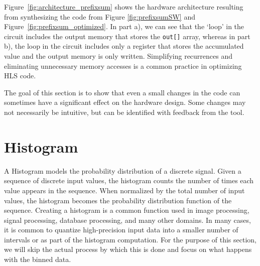 Figure~\ref{fig:architecture_prefixsum} shows the hardware architecture resulting from synthesizing the code from Figure \ref{fig:prefixsumSW} and Figure~\ref{fig:prefixsum_optimized}.   In part a), we can see that the `loop' in the circuit includes the output memory that stores the \lstinline{out[]} array, whereas in part b), the loop in the circuit includes only a register that stores the accumulated value and the output memory is only written.  Simplifying recurrences and eliminating unnecessary memory accesses is a common practice in optimizing HLS code.



The goal of this section is to show that even a small changes in the code can sometimes have a significant effect on the hardware design. Some changes may not necessarily be intuitive, but can be identified with feedback from the tool.

\section{Histogram}
\label{sec:histogram}

A Histogram models the probability distribution of a discrete signal. Given a sequence of discrete input values, the histogram counts the number of times each value appears in the sequence.  When normalized by the total number of input values, the histogram becomes the probability distribution function of the sequence.  Creating a histogram is a common function used in image processing, signal processing, database processing, and many other domains.  In many cases, it is common to quantize high-precision input data into a smaller number of intervals or  as part of the histogram computation.  For the purpose of this section, we will skip the actual process by which this is done and focus on what happens with the binned data.

